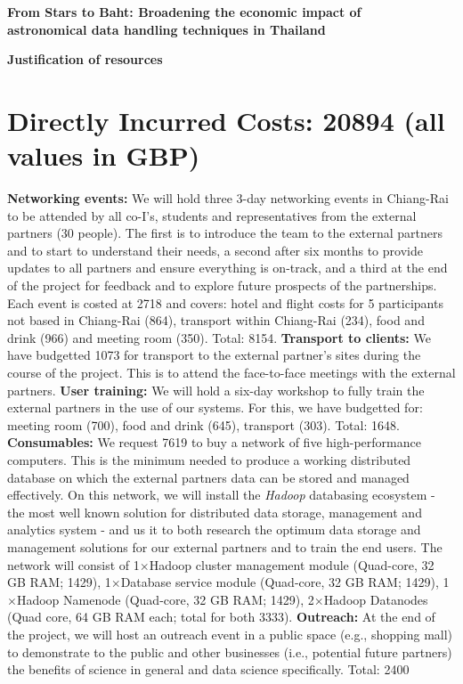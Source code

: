 \documentclass[11pt]{article}
\begin{document}
\setcounter{figure}{0}
\noindent
{\LARGE \bf From Stars to Baht: Broadening the economic impact of \\
astronomical data handling techniques in Thailand}

\vspace{3mm}
\noindent
{\LARGE \bf Justification of resources }
\vspace{-3mm}
\section{Directly Incurred Costs: 20894 (all values in GBP)}
\vspace{-3mm}
{\bf Networking events:} We will hold three 3-day networking events in Chiang-Rai to be attended by all co-I's, students and representatives from the external partners (30 people). The first is to introduce the team to the external partners and to start to understand their needs, a second after six months to provide updates to all partners and ensure everything is on-track, and a third at the end of the project for feedback and to explore future prospects of the partnerships. Each event is costed at 2718 and covers: hotel and flight costs for 5 participants not based in Chiang-Rai (864), transport within Chiang-Rai (234), food and drink (966) and meeting room (350). Total: 8154. {\bf Transport to clients:} We have budgetted 1073 for transport to the external partner's sites during the course of the project. This is to attend the face-to-face meetings with the external partners. {\bf User training:} We will hold a six-day workshop to fully train the external partners in the use of our systems. For this, we have budgetted for: meeting room (700), food and drink (645), transport (303). Total: 1648. {\bf Consumables:} We request 7619 to buy a network of five high-performance computers. This is the minimum needed to produce a working distributed database on which the external partners data can be stored and managed effectively. On this network, we will install the {\it Hadoop} databasing ecosystem - the most well known solution for distributed data storage, management and analytics system - and us it to both research the optimum data storage and management solutions for our external partners and to train the end users. The network will consist of 1$\times$Hadoop cluster management module (Quad-core, 32 GB RAM; 1429), 1$\times$Database service module (Quad-core, 32 GB RAM; 1429), 1$\times$Hadoop Namenode (Quad-core, 32 GB RAM; 1429), 2$\times$Hadoop Datanodes (Quad core, 64 GB RAM each; total for both 3333). {\bf Outreach:} At the end of the project, we will host an outreach event in a public space (e.g., shopping mall) to demonstrate to the public and other businesses (i.e., potential future partners) the benefits of science in general and data science specifically. Total: 2400
\end{document}
